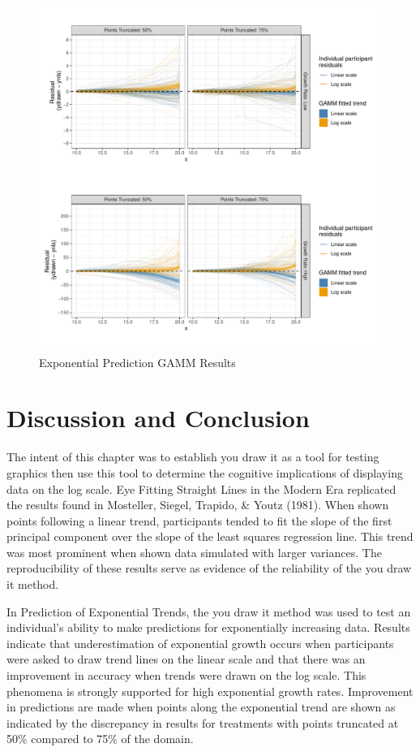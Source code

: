 \documentclass[print]{nuthesis}
\begin{document}
\begin{figure}[tbp]

{\centering \includegraphics[width=0.75\linewidth,]{thesis_files/figure-latex/exponential-prediction-gamm-preds-1} 

}

\caption{Exponential Prediction GAMM Results}\label{fig:exponential-prediction-gamm-preds}
\end{figure}

\hypertarget{discussion-and-conclusion-1}{%
\section{Discussion and Conclusion}\label{discussion-and-conclusion-1}}

The intent of this chapter was to establish you draw it as a tool for testing graphics then use this tool to determine the cognitive implications of displaying data on the log scale.
Eye Fitting Straight Lines in the Modern Era replicated the results found in Mosteller, Siegel, Trapido, \& Youtz (1981).
When shown points following a linear trend, participants tended to fit the slope of the first principal component over the slope of the least squares regression line.
This trend was most prominent when shown data simulated with larger variances.
The reproducibility of these results serve as evidence of the reliability of the you draw it method.

In Prediction of Exponential Trends, the you draw it method was used to test an individual's ability to make predictions for exponentially increasing data.
Results indicate that underestimation of exponential growth occurs when participants were asked to draw trend lines on the linear scale and that there was an improvement in accuracy when trends were drawn on the log scale.
This phenomena is strongly supported for high exponential growth rates.
Improvement in predictions are made when points along the exponential trend are shown as indicated by the discrepancy in results for treatments with points truncated at 50\% compared to 75\% of the domain.
\end{document}
